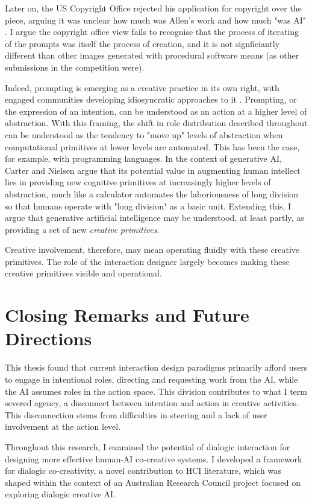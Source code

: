 Later on, the US Copyright Office rejected his application for copyright over the piece, arguing it was unclear how much was Allen's work and how much "was AI" \cite{US-Copyright-Office-Review-Board2023-nw}. I argue the copyright office view fails to recognise that the process of iterating of the prompts was itself the process of creation, and it is not signficiantly different than other images generated with procedural software means (as other submissions in the competition were). 

Indeed, prompting is emerging as a creative practice in its own right, with engaged communities developing idiosyncratic approaches to it \cite{Chang2023-tv, Smith2022-dm}. Prompting, or the expression of an intention, can be understood as an action at a higher level of abstraction. With this framing, the shift in role distribution described throughout can be understood as the tendency to "move up" levels of abstraction when computational primitives at lower levels are automated. This has been the case, for example, with programming languages. In the context of generative AI, Carter and Nielsen \cite{Carter2017-xj} argue that its potential value in augmenting human intellect lies in providing new cognitive primitives at increasingly higher levels of abstraction, much like a calculator automates the laboriousness of long division so that humans operate with "long division" as a basic unit. Extending this, I argue that generative artificial intelligence may be understood, at least partly, as providing a set of new \textit{creative primitives}.

Creative involvement, therefore, may mean operating fluidly with these creative primitives. The role of the interaction designer largely becomes making these creative primitives visible and operational. 

\section{Closing Remarks and Future Directions}

This thesis found that current interaction design paradigms primarily afford users to engage in intentional roles, directing and requesting work from the AI, while the AI assumes roles in the action space. This division contributes to what I term severed agency, a disconnect between intention and action in creative activities. This disconnection stems from difficulties in steering and a lack of user involvement at the action level.

Throughout this research, I examined the potential of dialogic interaction for designing more effective human-AI co-creative systems. I developed a framework for dialogic co-creativity, a novel contribution to HCI literature, which was shaped within the context of an Australian Research Council project focused on exploring dialogic creative AI.

